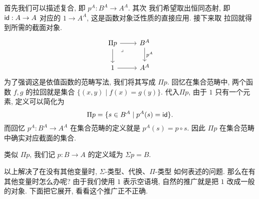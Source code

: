 首先我们可以描述复合, 即 \(p^A : B^A \to A^A\). 其次
我们希望取出恒同态射, 即 \(\textnormal{\textsf{id}}:A \to A\) 对应的
\(1 \to A^A\), 这是函数对象泛性质的直接应用. 接下来取
拉回就得到所需的截面对象.
\[\begin{tikzcd}
  {\Pi p} & {B^A} \\
  1 & {A^A}
  \arrow["{p^A}", from=1-2, to=2-2]
  \arrow[from=2-1, to=2-2]
  \arrow[from=1-1, to=2-1]
  \arrow[from=1-1, to=1-2]
  \arrow["\lrcorner"{anchor=center, pos=0.125}, draw=none, from=1-1, to=2-2]
\end{tikzcd}\]
为了强调这是依值函数的范畴写法, 我们将其写成 \(\Pi p\).
回忆在集合范畴中, 两个函数 \(f,g\) 的拉回就是集合
\(\{(x,y) \mid f(x) = g(y)\}\). 代入\(\Pi p\), 
由于 \(1\) 只有一个元素, 定义可以简化为
\[\Pi p = \{ s \in B^A \mid p^A(s) = \textnormal{\textsf{id}}\}.\]
而回忆 \(p^A : B^A \to A^A\) 在集合范畴的定义就是
\(p^A(s) = p \circ s\). 因此 \(\Pi p\) 在集合范畴
中确实对应截面的集合.

类似 \(\Pi p\), 我们记 \(p : B \to A\) 的定义域为 \(\Sigma p = B\).

以上解决了在没有其他变量时, \(\Sigma\)-类型、代换、\(\Pi\)-类型
如何表述的问题. 那么在有其他变量时怎么办呢? 由于我们使用
\(1\) 表示空语境, 自然的推广就是把 \(1\) 改成一般的对象.
下面把它展开, 看看这个推广正不正确.

